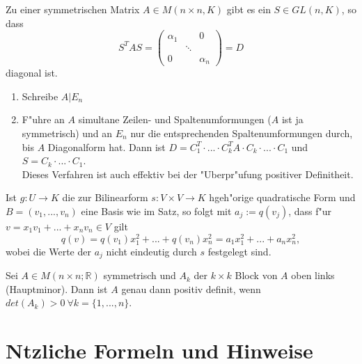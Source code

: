 \documentclass[11pt, a4paper]{article}
\begin{document}
\begin{corollary}
Zu einer symmetrischen Matrix $A \in M(n \times n, K)$ gibt es ein $S \in GL(n, K)$, so dass 
$$
S^T A S = \left(\begin{array}{ccc}\alpha_{1} & & 0 
\\ & \ddots & 
\\ 0 & & \alpha_{n}\end{array}\right) = D
$$
diagonal ist.
\end{corollary}

\begin{remark} 
\begin{enumerate}
\item Schreibe $A | E_n$
\item F"uhre an $A$ simultane Zeilen- und Spaltenumformungen ($A$ ist ja symmetrisch) und an $E_n$ nur die entsprechenden Spaltenumformungen durch, bis $A$ Diagonalform hat. Dann ist $D = C_1^T \cdot ... \cdot C_k^T A \cdot C_k \cdot ... \cdot C_1$ und $S = C_k \cdot ... \cdot C_1$.
\\ Dieses Verfahren ist auch effektiv bei der "Uberpr"ufung positiver Definitheit.
\end{enumerate}


\end{remark}

\begin{remark}
Ist $g : U \rightarrow K$ die zur Bilinearform $s : V \times V \rightarrow K$ hgeh"orige quadratische Form und $B = (v_1, ... , v_n)$ eine Basis wie im Satz, so folgt mit $a_j := q(v_j)$, dass f"ur $v = x_1 v_1 + ... + x_n v_n \in V$ gilt 
$$
q(v) = q(v_1) x_1^2 + ... + q(v_n) x_n^2 = a_1 x_1^2 + ... + a_n x_n^2,
$$
wobei die Werte der $a_j$ nicht eindeutig durch $s$ festgelegt sind.

\end{remark}

\begin{theorem}
Sei $A \in M(n \times n; \mathbb{R})$ symmetrisch und $A_k$ der $k\times k$ Block von $A$ oben links (Hauptminor). Dann ist $A$ genau dann positiv definit, wenn $det(A_k) > 0 \ \forall k = \{1, ..., n\}$.
\end{theorem}


\section{N\uee tzliche Formeln und Hinweise}
\end{document}
